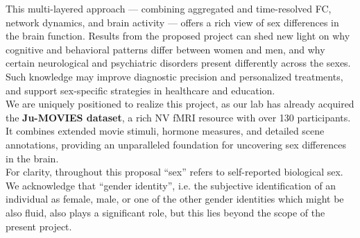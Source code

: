 \documentclass[11pt,a4paper]{article}
\begin{document}
This multi-layered approach — combining aggregated and time-resolved FC, network dynamics, and brain activity — offers 
a rich view of sex differences in the brain function. 
Results from the proposed project can shed new light on why cognitive and behavioral patterns differ 
between women and men, and why certain neurological and psychiatric disorders present differently across the sexes. 
Such knowledge may improve diagnostic precision and personalized treatments, and support sex-specific 
strategies in healthcare and education.\\
We are uniquely positioned to realize this project, as our lab has already acquired the \textbf{Ju-MOVIES dataset}, 
a rich NV fMRI resource with over 130 participants. It combines extended movie stimuli, 
hormone measures, and detailed scene annotations, providing an unparalleled foundation for 
uncovering sex differences in the brain.\\
For clarity, throughout this proposal “sex” refers to self-reported biological sex. 
We acknowledge that “gender identity”, i.e. the 
subjective identification of an individual as female, male, or one of the other gender identities which might 
be also fluid, also plays a significant role, but this lies 
beyond the scope of the present project.
\end{document}
